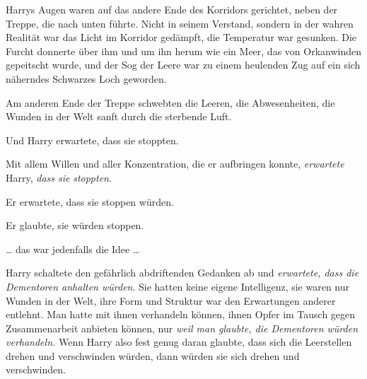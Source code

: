 Harrys Augen waren auf das andere Ende des Korridors gerichtet, neben der Treppe, die nach unten führte. Nicht in seinem Verstand, sondern in der wahren Realität war das Licht im Korridor gedämpft, die Temperatur war gesunken. Die Furcht donnerte über ihm und um ihn herum wie ein Meer, das von Orkanwinden gepeitscht wurde, und der Sog der Leere war zu einem heulenden Zug auf ein sich näherndes Schwarzes Loch geworden.

Am anderen Ende der Treppe schwebten die Leeren, die Abwesenheiten, die Wunden in der Welt sanft durch die sterbende Luft.

Und Harry erwartete, dass sie stoppten.

Mit allem Willen und aller Konzentration, die er aufbringen konnte, \emph{erwartete} Harry, \emph{dass sie} \emph{stoppten}.

Er erwartete, dass sie stoppen würden.

Er glaubte, sie würden stoppen.

… das war jedenfalls die Idee …

Harry schaltete den gefährlich abdriftenden Gedanken ab und \emph{erwartete, dass die Dementoren anhalten würden}. Sie hatten keine eigene Intelligenz, sie waren nur Wunden in der Welt, ihre Form und Struktur war den Erwartungen anderer entlehnt. Man hatte mit ihnen verhandeln können, ihnen Opfer im Tausch gegen Zusammenarbeit anbieten können, nur \emph{weil man glaubte, die Dementoren würden verhandeln.} Wenn Harry also fest genug daran glaubte, dass sich die Leerstellen drehen und verschwinden würden, dann würden sie sich drehen und verschwinden.

